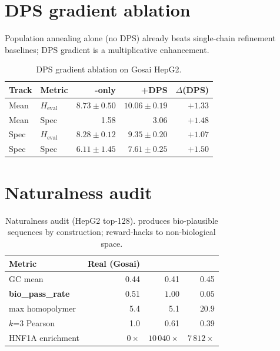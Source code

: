 \section{DPS gradient ablation}\label{app:dps_ablation}

Population annealing alone (no DPS) already beats single-chain refinement baselines; DPS gradient is a multiplicative enhancement.

\begin{table}[h]
\caption{DPS gradient ablation on Gosai HepG2.}
\label{tab:dps_ablation}
\centering
\small
\begin{tabular}{llrrr}
\toprule
Track & Metric & \gpa{}-only & \gpa{}+DPS & $\Delta$(DPS) \\
\midrule
Mean & $H_{\mathrm{eval}}$ & $8.73\pm 0.50$ & $\mathbf{10.06\pm 0.19}$ & $+1.33$ \\
Mean & Spec & 1.58 & 3.06 & $+1.48$ \\
Spec & $H_{\mathrm{eval}}$ & $8.28\pm 0.12$ & $9.35\pm 0.20$ & $+1.07$ \\
Spec & Spec & $6.11\pm 1.45$ & $\mathbf{7.61\pm 0.25}$ & $+1.50$ \\
\bottomrule
\end{tabular}
\end{table}

\section{Naturalness audit}\label{app:naturalness}

\begin{table}[h]
\caption{Naturalness audit (HepG2 top-128). \gpa{} produces bio-plausible sequences by construction; \ctrldna{} reward-hacks to non-biological space.}
\label{tab:nat}
\centering
\small
\begin{tabular}{lrrr}
\toprule
Metric & Real (Gosai) & \gpa{} & \ctrldna{} \\
\midrule
GC mean & 0.44 & 0.41 & 0.45 \\
\textbf{bio\_pass\_rate} & 0.51 & $\mathbf{1.00}$ & $\mathbf{0.05}$ \\
max homopolymer & 5.4 & 5.1 & $\mathbf{20.9}$ \\
$k$=3 Pearson & 1.0 & 0.61 & 0.39 \\
HNF1A enrichment & $0\times$ & $10\,040\times$ & $7\,812\times$ \\
\bottomrule
\end{tabular}
\end{table}

